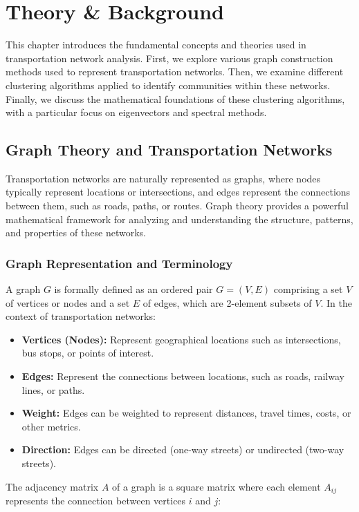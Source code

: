\chapter{Theory \& Background}
\label{ch:basics}
This chapter introduces the fundamental concepts and theories used in transportation network analysis. First, we explore various graph construction methods used to represent transportation networks. Then, we examine different clustering algorithms applied to identify communities within these networks. Finally, we discuss the mathematical foundations of these clustering algorithms, with a particular focus on eigenvectors and spectral methods.

\section{Graph Theory and Transportation Networks}
\label{se:GraphTheory}
Transportation networks are naturally represented as graphs, where nodes typically represent locations or intersections, and edges represent the connections between them, such as roads, paths, or routes. Graph theory provides a powerful mathematical framework for analyzing and understanding the structure, patterns, and properties of these networks.

\subsection{Graph Representation and Terminology}

A graph $G$ is formally defined as an ordered pair $G = (V, E)$ comprising a set $V$ of vertices or nodes and a set $E$ of edges, which are 2-element subsets of $V$. In the context of transportation networks:

\begin{itemize}
    \item \textbf{Vertices (Nodes):} Represent geographical locations such as intersections, bus stops, or points of interest.
    \item \textbf{Edges:} Represent the connections between locations, such as roads, railway lines, or paths.
    \item \textbf{Weight:} Edges can be weighted to represent distances, travel times, costs, or other metrics.
    \item \textbf{Direction:} Edges can be directed (one-way streets) or undirected (two-way streets).
\end{itemize}

The adjacency matrix $A$ of a graph is a square matrix where each element $A_{ij}$ represents the connection between vertices $i$ and $j$:

